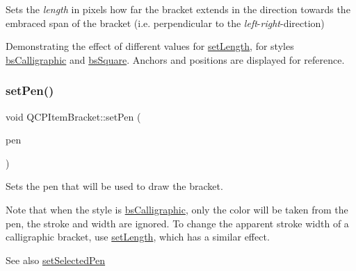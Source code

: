 Sets the {\itshape length} in pixels how far the bracket extends in the direction towards the embraced span of the bracket (i.\+e. perpendicular to the {\itshape left}-\/{\itshape right}-\/direction)

 \begin{center}Demonstrating the effect of different values for \hyperlink{class_q_c_p_item_bracket_ac7cfc3da7da9b5c5ac5dfbe4f0351b2a}{set\+Length}, for styles \hyperlink{class_q_c_p_item_bracket_a7ac3afd0b24a607054e7212047d59dbda8f29f5ef754e2dc9a9efdedb2face0f3}{bs\+Calligraphic} and \hyperlink{class_q_c_p_item_bracket_a7ac3afd0b24a607054e7212047d59dbda7f9df4a7359bfe3dac1dbe4ccf5d220c}{bs\+Square}. Anchors and positions are displayed for reference.\end{center}  \mbox{\label{class_q_c_p_item_bracket_ab13001d9cc5d8f9e56ea15bdda682acb}} 
\subsubsection{\texorpdfstring{set\+Pen()}{setPen()}}
{\footnotesize\ttfamily void Q\+C\+P\+Item\+Bracket\+::set\+Pen (\begin{DoxyParamCaption}\item[{const Q\+Pen \&}]{pen }\end{DoxyParamCaption})}

Sets the pen that will be used to draw the bracket.

Note that when the style is \hyperlink{class_q_c_p_item_bracket_a7ac3afd0b24a607054e7212047d59dbda8f29f5ef754e2dc9a9efdedb2face0f3}{bs\+Calligraphic}, only the color will be taken from the pen, the stroke and width are ignored. To change the apparent stroke width of a calligraphic bracket, use \hyperlink{class_q_c_p_item_bracket_ac7cfc3da7da9b5c5ac5dfbe4f0351b2a}{set\+Length}, which has a similar effect.

\begin{DoxySeeAlso}{See also}
\hyperlink{class_q_c_p_item_bracket_a349785c31122778a520c64891fa204c5}{set\+Selected\+Pen} 
\end{DoxySeeAlso}
\mbox{\label{class_q_c_p_item_bracket_a349785c31122778a520c64891fa204c5}} 
